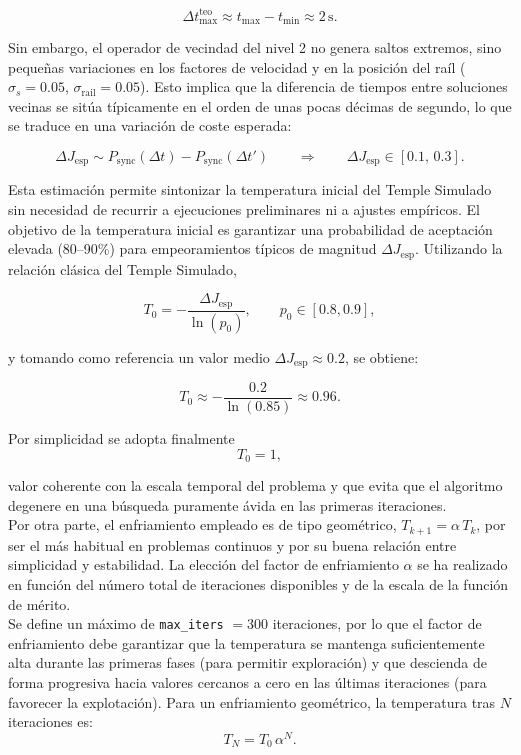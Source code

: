 \[
\Delta t_{\max}^{\text{teo}} \approx t_{\max} - t_{\min} \approx 2\,\text{s}.
\]



Sin embargo, el operador de vecindad del nivel 2 no genera saltos extremos, sino
pequeñas variaciones en los factores de velocidad y en la posición del raíl
(\(\sigma_s = 0.05\), \(\sigma_{\text{rail}} = 0.05\)). Esto implica que la
diferencia de tiempos entre soluciones vecinas se sitúa típicamente en el orden
de unas pocas décimas de segundo, lo que se traduce en una variación de coste
esperada:


\[
\Delta J_{\text{esp}} \sim P_{\text{sync}}(\Delta t) - P_{\text{sync}}(\Delta t')
\qquad\Rightarrow\qquad
\Delta J_{\text{esp}} \in [0.1,\, 0.3].
\]



Esta estimación permite sintonizar la temperatura inicial del Temple Simulado
sin necesidad de recurrir a ejecuciones preliminares ni a ajustes empíricos. El
objetivo de la temperatura inicial es garantizar una probabilidad de aceptación
elevada (80--90\%) para empeoramientos típicos de magnitud
\(\Delta J_{\text{esp}}\). Utilizando la relación clásica del Temple Simulado,


\[
T_0 = -\frac{\Delta J_{\text{esp}}}{\ln(p_0)}, \qquad p_0 \in [0.8,0.9],
\]


y tomando como referencia un valor medio \(\Delta J_{\text{esp}} \approx 0.2\),
se obtiene:


\[
T_0 \approx -\frac{0.2}{\ln(0.85)} \approx 0.96.
\]



Por simplicidad se adopta finalmente
\[
T_0 = 1,
\]

valor coherente con la escala temporal del problema y que evita que el algoritmo
degenere en una búsqueda puramente ávida en las primeras iteraciones. \\

Por otra parte, el enfriamiento empleado es de tipo geométrico, 
\(T_{k+1} = \alpha\, T_k\), por ser el más habitual en problemas continuos y por su buena 
relación entre simplicidad y estabilidad. La elección del factor de enfriamiento \(\alpha\) 
se ha realizado en función del número total de iteraciones disponibles y de la escala de la función
de mérito. \\

Se define un máximo de \texttt{max\_iters} \(= 300\)
iteraciones, por lo que el factor de enfriamiento debe garantizar que la temperatura se
mantenga suficientemente alta durante las primeras fases (para permitir
exploración) y que descienda de forma progresiva hacia valores cercanos a cero
en las últimas iteraciones (para favorecer la explotación). Para un enfriamiento
geométrico, la temperatura tras \(N\) iteraciones es:
\[
T_N = T_0\, \alpha^N.
\]

